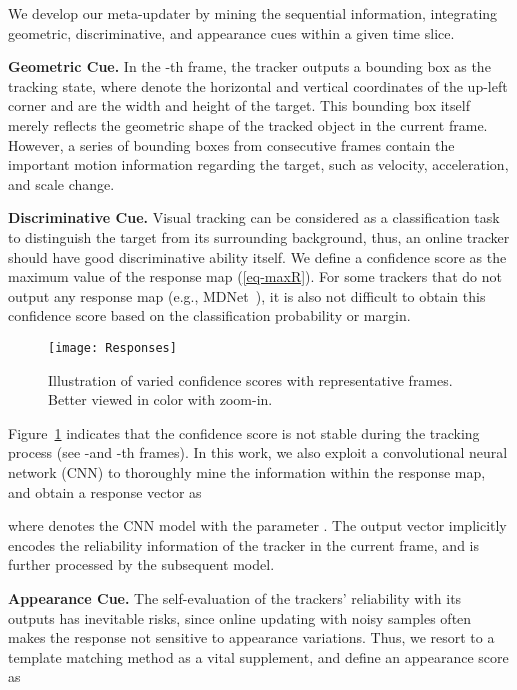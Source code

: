 \documentclass[10pt,twocolumn,letterpaper]{article}
\begin{document}
We develop our meta-updater by mining the sequential information, integrating geometric,
discriminative, and appearance cues within a given time slice.

\noindent \textbf{Geometric Cue.} In the -th frame, the tracker outputs a bounding
box  as the tracking state, where
 denote the horizontal and vertical coordinates of the up-left corner
and  are the width and height of the target.
This bounding box itself merely reflects the geometric shape of the tracked object in the
current frame.
However, a series of bounding boxes from consecutive frames contain the important motion
information regarding the target, such as velocity, acceleration, and scale change.

\noindent \textbf{Discriminative Cue.} Visual tracking can be considered as a classification
task to distinguish the target from its surrounding background, thus, an online tracker should
have good discriminative ability itself. We define a confidence score 
as the maximum value of the response map  (\ref{eq-maxR}).
For some trackers that do not output any response map (e.g., MDNet~\cite{Nam-CVPR16-MDNet}),
it is also not difficult to obtain this confidence score based on the classification probability or margin.


\begin{figure}[t]
	\begin{center}
		\texttt{[image: Responses]}
	\end{center}
	\vspace{-3mm}
	\caption{Illustration of varied confidence scores with representative frames.
	Better viewed in color with zoom-in.}
	\label{fig-response}
	\vspace{-4mm}
\end{figure}

Figure~\ref{fig-response} indicates that the confidence score is not stable during the tracking
process (see -and -th frames).
In this work, we also exploit a convolutional neural network (CNN) to thoroughly mine the
information within the response map, and obtain a response vector  as

where  denotes the CNN model with the parameter .
The output vector  implicitly encodes the reliability information of the tracker in
the current frame, and is further processed by the subsequent model.

\noindent \textbf{Appearance Cue.} The self-evaluation of the trackers' reliability with its
outputs has inevitable risks, since online updating with noisy samples often makes the response not
sensitive to appearance variations.
Thus, we resort to a template matching method as a vital supplement, and define an appearance
score as
\end{document}
